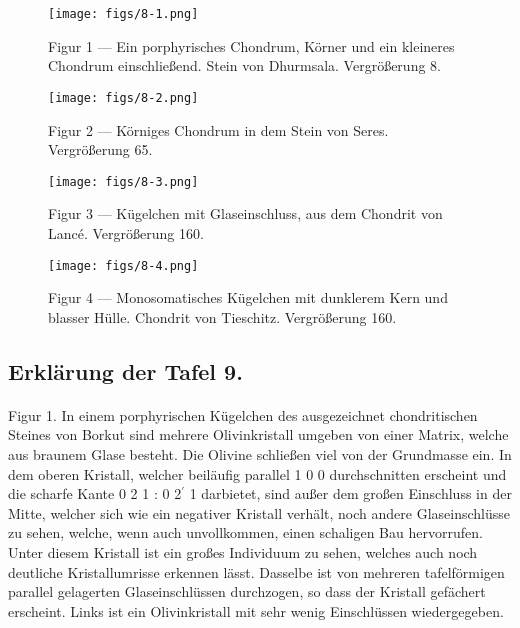 \documentclass[a4paper, 11pt, oneside, polutonikogreek, german]{article}
\begin{document}
\vspace*{\fill}
\begin{figure}[H]
\centering
\texttt{[image: figs/8-1.png]}
\caption{\small Figur 1 --- Ein porphyrisches Chondrum, Körner und ein kleineres Chondrum einschließend. Stein von Dhurmsala. Vergrößerung 8.}
\end{figure}
\vspace*{\fill}
\clearpage

\vspace*{\fill}
\begin{figure}[H]
\centering
\texttt{[image: figs/8-2.png]}
\caption{\small Figur 2 --- Körniges Chondrum in dem Stein von Seres. Vergrößerung 65.}
\end{figure}
\vspace*{\fill}
\clearpage

\vspace*{\fill}
\begin{figure}[H]
\centering
\texttt{[image: figs/8-3.png]}
\caption{\small Figur 3 --- Kügelchen mit Glaseinschluss, aus dem Chondrit von Lancé. Vergrößerung 160.}
\end{figure}
\vspace*{\fill}
\clearpage

\vspace*{\fill}
\begin{figure}[H]
\centering
\texttt{[image: figs/8-4.png]}
\caption{\small Figur 4 --- Monosomatisches Kügelchen mit dunklerem Kern und blasser Hülle. Chondrit von Tieschitz. Vergrößerung 160.}
\end{figure}
\vspace*{\fill}
\clearpage

\subsection{Erklärung der Tafel 9.}
\paragraph{}
Figur 1. In einem porphyrischen Kügelchen des ausgezeichnet chondritischen Steines von Borkut sind mehrere Olivinkristall umgeben von einer Matrix, welche aus braunem Glase besteht. Die Olivine schließen viel von der Grundmasse ein. In dem oberen Kristall, welcher beiläufig parallel 1 0 0 durchschnitten erscheint und die scharfe Kante 0 2 1 : 0 2$^{\prime}$ 1 darbietet, sind außer dem großen Einschluss in der Mitte, welcher sich wie ein negativer Kristall verhält, noch andere Glaseinschlüsse zu sehen, welche, wenn auch unvollkommen, einen schaligen Bau hervorrufen. Unter diesem Kristall ist ein großes Individuum zu sehen, welches auch noch deutliche Kristallumrisse erkennen lässt. Dasselbe ist von mehreren tafelförmigen parallel gelagerten Glaseinschlüssen durchzogen, so dass der Kristall gefächert erscheint. Links ist ein Olivinkristall mit sehr wenig Einschlüssen wiedergegeben.
\end{document}
